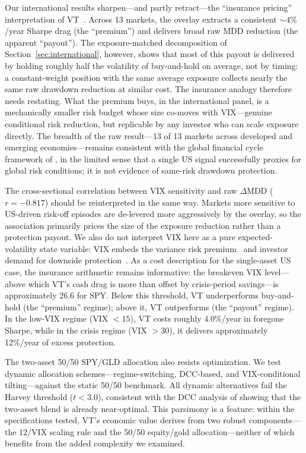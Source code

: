 Our international results sharpen---and partly retract---the ``insurance pricing'' interpretation of VT~\citep{lai2026a}. Across 13 markets, the overlay extracts a consistent ${\sim}4\%$/year Sharpe drag (the ``premium'') and delivers broad raw MDD reduction (the apparent ``payout''). The exposure-matched decomposition of Section~\ref{sec:international}, however, shows that most of this payout is delivered by holding roughly half the volatility of buy-and-hold on average, not by timing: a constant-weight position with the same average exposure collects nearly the same raw drawdown reduction at similar cost. The insurance analogy therefore needs restating. What the premium buys, in the international panel, is a mechanically smaller risk budget whose size co-moves with VIX---genuine conditional risk reduction, but replicable by any investor who can scale exposure directly. The breadth of the raw result---13 of 13 markets across developed and emerging economies---remains consistent with the global financial cycle framework of \citet{miranda2020}, in the limited sense that a single US signal successfully proxies for global risk conditions; it is not evidence of same-risk drawdown protection.

The cross-sectional correlation between VIX sensitivity and raw $\Delta$MDD ($r = -0.817$) should be reinterpreted in the same way. Markets more sensitive to US-driven risk-off episodes are de-levered more aggressively by the overlay, so the association primarily prices the size of the exposure reduction rather than a protection payout. We also do not interpret VIX here as a pure expected-volatility state variable: VIX embeds the variance risk premium~\citep{bollerslev2009} and investor demand for downside protection~\citep{bondarenko2019}. As a cost description for the single-asset US case, the insurance arithmetic remains informative: the breakeven VIX level---above which VT's cash drag is more than offset by crisis-period savings---is approximately 26.6 for SPY. Below this threshold, VT underperforms buy-and-hold (the ``premium'' regime); above it, VT outperforms (the ``payout'' regime). In the low-VIX regime (VIX $< 15$), VT costs roughly 4.0\%/year in foregone Sharpe, while in the crisis regime (VIX $> 30$), it delivers approximately 12\%/year of excess protection.

The two-asset 50/50 SPY/GLD allocation also resists optimization. We test dynamic allocation schemes---regime-switching, DCC-based, and VIX-conditional tilting---against the static 50/50 benchmark. All dynamic alternatives fail the Harvey threshold ($t < 3.0$), consistent with the DCC analysis of \citet{lai2026a} showing that the two-asset blend is already near-optimal. This parsimony is a feature: within the specifications tested, VT's economic value derives from two robust components---the $12/\text{VIX}$ scaling rule and the 50/50 equity/gold allocation---neither of which benefits from the added complexity we examined.

